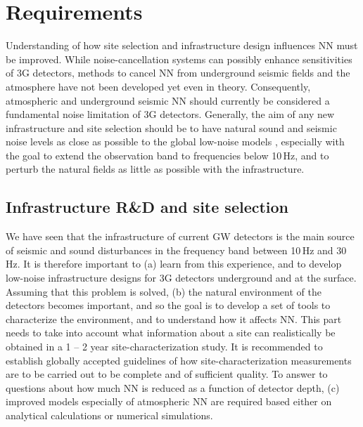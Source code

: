 \section{Requirements}
Understanding of how site selection and infrastructure design influences NN must be improved. While noise-cancellation systems can possibly enhance sensitivities of 3G detectors, methods to cancel NN from underground seismic fields and the atmosphere have not been developed yet even in theory. Consequently, atmospheric and underground seismic NN should currently be considered a fundamental noise limitation of 3G detectors. Generally, the aim of any new infrastructure and site selection should be to have natural sound and seismic noise levels as close as possible to the global low-noise models \cite{Pet1993}, especially with the goal to extend the observation band to frequencies below 10\,Hz, and to perturb the natural fields as little as possible with the infrastructure. 

\subsection{Infrastructure R\&D and site selection}
We have seen that the infrastructure of current GW detectors is the main source of seismic and sound disturbances in the frequency band between 10\,Hz and 30\,Hz. It is therefore important to (a) learn from this experience, and to develop low-noise infrastructure designs for 3G detectors underground and at the surface. Assuming that this problem is solved, (b) the natural environment of the detectors becomes important, and so the goal is to develop a set of tools to characterize the environment, and to understand how it affects NN. This part needs to take into account what information about a site can realistically be obtained in a 1 -- 2 year site-characterization study. It is recommended to establish globally accepted guidelines of how site-characterization measurements are to be carried out to be complete and of sufficient quality. To answer to questions about how much NN is reduced as a function of detector depth, (c) improved models especially of atmospheric NN are required based either on analytical calculations or numerical simulations.

